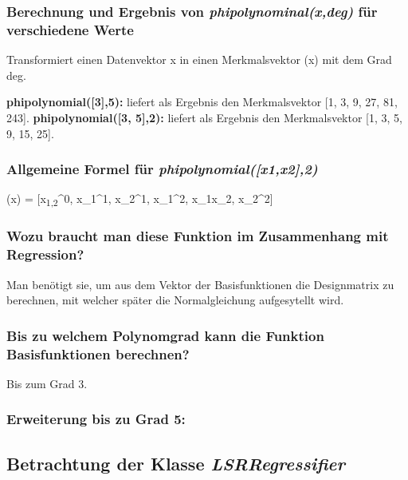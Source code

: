\subsubsection{ Berechnung und Ergebnis von \textit{phi\textunderscore polynominal(x,deg)} für verschiedene Werte}

Transformiert einen Datenvektor x in einen Merkmalsvektor \phi (x) mit dem Grad deg. 

\noindent
\textbf{phi\textunderscore polynomial([3],5):} liefert als Ergebnis den Merkmalsvektor [1, 3, 9, 27, 81, 243].
\noindent
\textbf{phi\textunderscore polynomial([3, 5],2):} liefert als Ergebnis den Merkmalsvektor [1, 3, 5, 9, 15, 25].

\subsubsection{ Allgemeine Formel für \textit{phi\textunderscore polynomial([x1,x2],2)} }

\begin{center}
    \phi (x) = [x\textsubscript{1,2}^0, x_1^1, x_2^1, x_1^2, x_1\cdot x_2, x_2^2]
\end{center}

\subsubsection{ Wozu braucht man diese Funktion im Zusammenhang mit Regression? }

\noindent
 \vspace{0px}
Man benötigt sie, um aus dem Vektor der Basisfunktionen die Designmatrix zu berechnen, mit welcher später die Normalgleichung aufgesytellt wird. 

\subsubsection{ Bis zu welchem Polynomgrad kann die Funktion Basisfunktionen berechnen? }

\noindent
 \vspace{0px}
Bis zum Grad 3.

\subsubsection{ Erweiterung bis zu Grad 5: }

\subsection{
    Betrachtung der Klasse \textit{LSRRegressifier}
}


